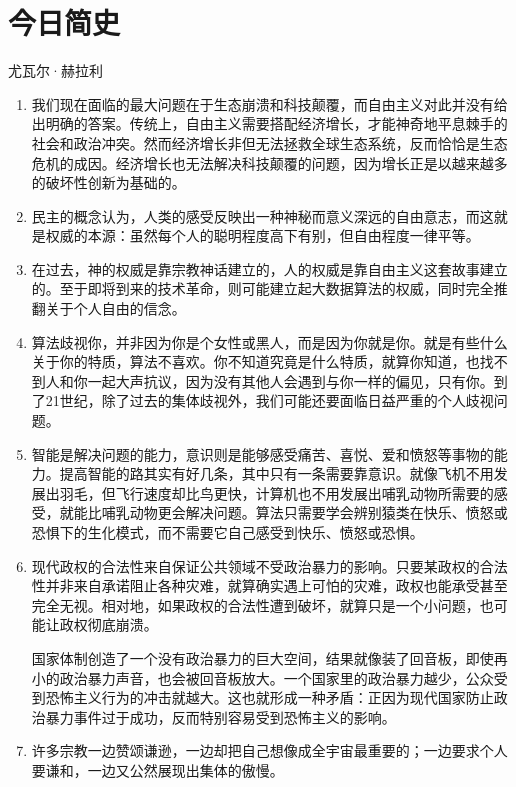 \documentclass[UTF8]{ctexart}
\begin{document}
	\section{今日简史}
		\centering 尤瓦尔·赫拉利
		
		
		\begin{enumerate}
			\item 我们现在面临的最大问题在于生态崩溃和科技颠覆，而自由主义对此并没有给出明确的答案。传统上，自由主义需要搭配经济增长，才能神奇地平息棘手的社会和政治冲突。然而经济增长非但无法拯救全球生态系统，反而恰恰是生态危机的成因。经济增长也无法解决科技颠覆的问题，因为增长正是以越来越多的破坏性创新为基础的。
			
			\item 民主的概念认为，人类的感受反映出一种神秘而意义深远的自由意志，而这就是权威的本源：虽然每个人的聪明程度高下有别，但自由程度一律平等。
			
			\item 在过去，神的权威是靠宗教神话建立的，人的权威是靠自由主义这套故事建立的。至于即将到来的技术革命，则可能建立起大数据算法的权威，同时完全推翻关于个人自由的信念。
			
			\item 算法歧视你，并非因为你是个女性或黑人，而是因为你就是你。就是有些什么关于你的特质，算法不喜欢。你不知道究竟是什么特质，就算你知道，也找不到人和你一起大声抗议，因为没有其他人会遇到与你一样的偏见，只有你。到了21世纪，除了过去的集体歧视外，我们可能还要面临日益严重的个人歧视问题。
			
			\item  智能是解决问题的能力，意识则是能够感受痛苦、喜悦、爱和愤怒等事物的能力。提高智能的路其实有好几条，其中只有一条需要靠意识。就像飞机不用发展出羽毛，但飞行速度却比鸟更快，计算机也不用发展出哺乳动物所需要的感受，就能比哺乳动物更会解决问题。算法只需要学会辨别猿类在快乐、愤怒或恐惧下的生化模式，而不需要它自己感受到快乐、愤怒或恐惧。
			
			\item  现代政权的合法性来自保证公共领域不受政治暴力的影响。只要某政权的合法性并非来自承诺阻止各种灾难，就算确实遇上可怕的灾难，政权也能承受甚至完全无视。相对地，如果政权的合法性遭到破坏，就算只是一个小问题，也可能让政权彻底崩溃。
			
			国家体制创造了一个没有政治暴力的巨大空间，结果就像装了回音板，即使再小的政治暴力声音，也会被回音板放大。一个国家里的政治暴力越少，公众受到恐怖主义行为的冲击就越大。这也就形成一种矛盾：正因为现代国家防止政治暴力事件过于成功，反而特别容易受到恐怖主义的影响。
			
			\item  许多宗教一边赞颂谦逊，一边却把自己想像成全宇宙最重要的；一边要求个人要谦和，一边又公然展现出集体的傲慢。
			

\end{enumerate}
\end{document}
